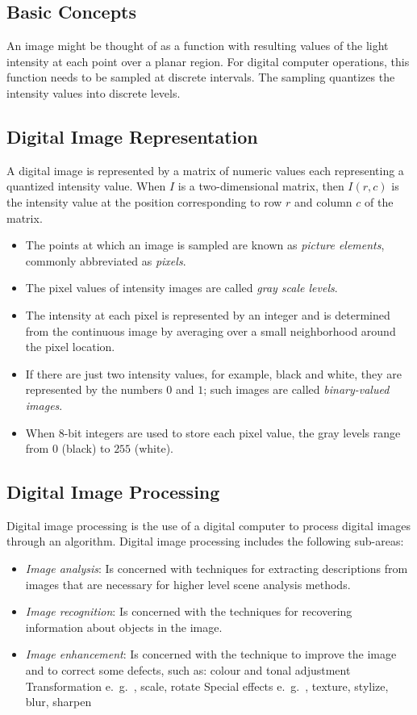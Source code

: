 \subsection{Basic Concepts}
An image might be thought of as a function with resulting values of the light intensity at each point over a planar region. For digital computer operations, this function needs to be sampled at discrete intervals. The sampling quantizes the intensity values into discrete levels.

\subsection*{Digital Image Representation}
A digital image is represented by a matrix of numeric values each representing a quantized intensity value. When $ I $ is a two-dimensional matrix, then $ I(r, c) $ is the intensity value at the position corresponding to row $ r $ and column $ c $ of the matrix.

\begin{itemize}
	\item The points at which an image is sampled are known as \textit{picture elements}, commonly abbreviated as \textit{pixels}.
	\item The pixel values of intensity images are called \textit{gray scale levels}.
	\item The intensity at each pixel is represented by an integer and is determined from the continuous image by averaging over a small neighborhood around the pixel location.
	\item If there are just two intensity values, for example, black and white, they are represented by the numbers $ 0 $ and $ 1 $; such images are called \textit{binary-valued images}.
	\item When 8-bit integers are used to store each pixel value, the gray levels range from $ 0 $ (black) to $ 255 $ (white).
\end{itemize}
 
 \subsection{Digital Image Processing}
  Digital image processing is the use of a digital computer to process digital images through an algorithm. Digital image processing includes the following sub-areas:
  
  \begin{itemize}
  	\item \textit{Image analysis}: Is concerned with techniques for extracting descriptions from images that are necessary for higher level scene analysis methods.
  	\item \textit{Image recognition}: Is concerned with the techniques for recovering information about objects in the image.
  	\item \textit{Image enhancement}: Is concerned with the technique to improve the image and to correct some defects, such as:
  	\subitem colour and tonal adjustment
  	\subitem Transformation e.\ g.\ , scale, rotate
  	\subitem Special effects e.\ g.\ , texture, stylize, blur, sharpen 
  \end{itemize}
  
